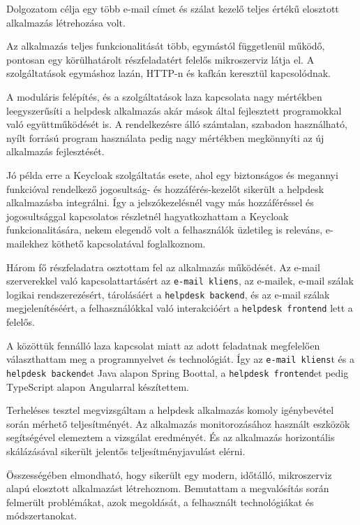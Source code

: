 Dolgozatom célja egy több e-mail címet és szálat kezelő teljes értékű elosztott alkalmazás létrehozása volt.

\bigskip
Az alkalmazás teljes funkcionalitását több, egymástól függetlenül működő, pontosan egy körülhatárolt részfeladatért felelős mikroszerviz látja el. A szolgáltatások egymáshoz lazán, HTTP-n és kafkán keresztül kapcsolódnak.

A moduláris felépítés, és a szolgáltatások laza kapcsolata nagy mértékben leegyszerűsíti a helpdesk alkalmazás akár mások által fejlesztett programokkal való együttműködését is. A rendelkezésre álló számtalan, szabadon használható, nyílt forrású program használata pedig nagy mértékben megkönnyíti az új alkalmazás fejlesztését.

Jó példa erre a Keycloak szolgáltatás esete, ahol egy biztonságos és megannyi funkcióval rendelkező jogosultság- és hozzáférés-kezelőt sikerült a helpdesk alkalmazásba integrálni. Így a jelszókezelésnél vagy más hozzáféréssel és jogosultsággal kapcsolatos részletnél hagyatkozhattam a Keycloak funkcionalitására, nekem elegendő volt a felhasználók üzletileg is releváns, e-mailekhez köthető kapcsolatával foglalkoznom.

\bigskip
Három fő részfeladatra osztottam fel az alkalmazás működését. Az e-mail szerverekkel való kapcsolattartásért az \texttt{e-mail kliens}, az e-mailek, e-mail szálak logikai rendszerezésért, tárolásáért a \texttt{helpdesk backend}, és az e-mail szálak megjelenítéséért, a felhasználókkal való interakcióért a \texttt{helpdesk frontend} lett a felelős.

A közöttük fennálló laza kapcsolat miatt az adott feladatnak megfelelően választhattam meg a programnyelvet és technológiát. Így az \texttt{e-mail kliens}t és a \texttt{helpdesk backend}et Java alapon Spring Boottal, a \texttt{helpdesk frontend}et pedig TypeScript alapon Angularral készítettem.


\bigskip
Terheléses tesztel megvizsgáltam a helpdesk alkalmazás komoly igénybevétel során mérhető teljesítményét. Az alkalmazás monitorozásához használt eszközök segítségével elemeztem a vizsgálat eredményét. És az alkalmazás horizontális skálázásával sikerült jelentős teljesítményjavulást elérni.

\pagebreak
Összességében elmondható, hogy sikerült egy modern, időtálló, mikroszerviz alapú elosztott alkalmazást létrehoznom. Bemutattam a megvalósítás során felmerült problémákat, azok megoldását, a felhasznált technológiákat és módszertanokat.
